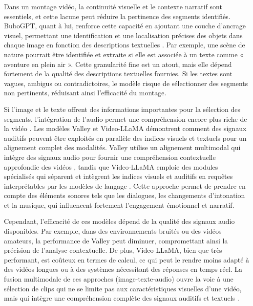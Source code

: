 Dans un montage vidéo, la continuité visuelle et le contexte narratif sont essentiels, et cette lacune peut réduire la pertinence des segments identifiés. BuboGPT, quant à lui, renforce cette capacité en ajoutant une couche d’ancrage visuel, permettant une identification et une localisation précises des objets dans chaque image en fonction des descriptions textuelles \cite{feng2023}\cite{munasinghe2023_pgvideo}. Par exemple, une scène de nature pourrait être identifiée et extraite si elle est associée à un texte comme « aventure en plein air ». Cette granularité fine est un atout, mais elle dépend fortement de la qualité des descriptions textuelles fournies. Si les textes sont vagues, ambigus ou contradictoires, le modèle risque de sélectionner des segments non pertinents, réduisant ainsi l’efficacité du montage. 

Si l’image et le texte offrent des informations importantes pour la sélection des segments, l’intégration de l’audio permet une compréhension encore plus riche de la vidéo \cite{anonymous2023_videollama}\cite{han2024_clip}. Les modèles Valley \cite{anonymous2023_valley} et Video-LLaMA \cite{anonymous2023_videollama} démontrent comment des signaux auditifs peuvent être exploités en parallèle des indices visuels et textuels pour un alignement complet des modalités. Valley utilise un alignement multimodal qui intègre des signaux audio pour fournir une compréhension contextuelle approfondie des vidéos \cite{huang2024_vtimellm}, tandis que Video-LLaMA emploie des modules spécialisés qui séparent et intègrent les indices visuels et auditifs en requêtes interprétables par les modèles de langage \cite{xu2024}. Cette approche permet de prendre en compte des éléments sonores tels que les dialogues, les changements d’intonation et la musique, qui influencent fortement l’engagement émotionnel et narratif. 

Cependant, l’efficacité de ces modèles dépend de la qualité des signaux audio disponibles. Par exemple, dans des environnements bruités ou des vidéos amateurs, la performance de Valley peut diminuer, compromettant ainsi la précision de l’analyse contextuelle. De plus, Video-LLaMA, bien que très performant, est coûteux en termes de calcul, ce qui peut le rendre moins adapté à des vidéos longues ou à des systèmes nécessitant des réponses en temps réel. La fusion multimodale de ces approches (image-texte-audio) ouvre la voie à une sélection de clips qui ne se limite pas aux caractéristiques visuelles d’une vidéo, mais qui intègre une compréhension complète des signaux auditifs et textuels \cite{wang2024_hawkeye}\cite{anonymous2017_localizing}. 

